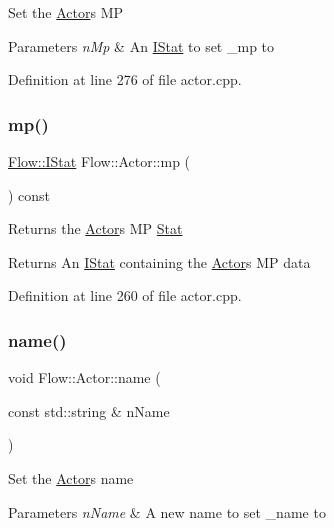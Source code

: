 Set the \hyperlink{class_flow_1_1_actor}{Actor}\textquotesingle{}s MP 
\begin{DoxyParams}{Parameters}
{\em n\+Mp} & An \hyperlink{class_flow_1_1_i_stat}{I\+Stat} to set \+\_\+mp to \\
\hline
\end{DoxyParams}


Definition at line 276 of file actor.\+cpp.

\hypertarget{class_flow_1_1_actor_a197cf5bc7b1b24c4e557adbdc6d9bbdf}{}\label{class_flow_1_1_actor_a197cf5bc7b1b24c4e557adbdc6d9bbdf} 
\subsubsection{\texorpdfstring{mp()}{mp()}\hspace{0.1cm}{\footnotesize\ttfamily [3/3]}}
{\footnotesize\ttfamily \hyperlink{class_flow_1_1_i_stat}{Flow\+::\+I\+Stat} Flow\+::\+Actor\+::mp (\begin{DoxyParamCaption}{ }\end{DoxyParamCaption}) const}

Returns the \hyperlink{class_flow_1_1_actor}{Actor}\textquotesingle{}s MP \hyperlink{class_flow_1_1_stat}{Stat} \begin{DoxyReturn}{Returns}
An \hyperlink{class_flow_1_1_i_stat}{I\+Stat} containing the \hyperlink{class_flow_1_1_actor}{Actor}\textquotesingle{}s MP data 
\end{DoxyReturn}


Definition at line 260 of file actor.\+cpp.

\hypertarget{class_flow_1_1_actor_ad30420df40d6fec219c9bbac83762b8a}{}\label{class_flow_1_1_actor_ad30420df40d6fec219c9bbac83762b8a} 
\subsubsection{\texorpdfstring{name()}{name()}\hspace{0.1cm}{\footnotesize\ttfamily [1/2]}}
{\footnotesize\ttfamily void Flow\+::\+Actor\+::name (\begin{DoxyParamCaption}\item[{const std\+::string \&}]{n\+Name }\end{DoxyParamCaption})}

Set the \hyperlink{class_flow_1_1_actor}{Actor}\textquotesingle{}s name 
\begin{DoxyParams}{Parameters}
{\em n\+Name} & A new name to set \+\_\+name to \\
\hline
\end{DoxyParams}


